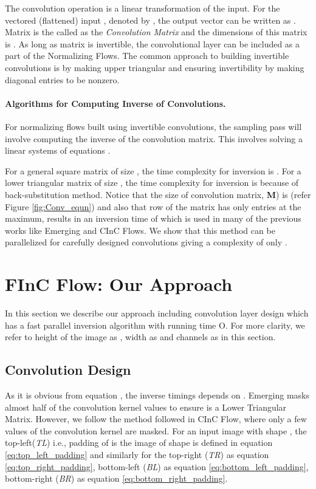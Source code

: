 \documentclass[a4paper,twoside]{article}
\theoremstyle{definition}
\begin{document}
The convolution operation is a linear transformation of the input. For the vectored (flattened) input , denoted by , the output vector  can be written as  . Matrix  is the called as the \emph{Convolution Matrix} and the dimensions of this matrix is . As long as matrix  is invertible, the convolutional layer can be included as a part of the Normalizing Flows. The common approach to building invertible convolutions is by making  upper triangular and ensuring invertibility by making diagonal entries to be nonzero.



\paragraph{Algorithms for Computing Inverse of Convolutions.}
For normalizing flows built using invertible convolutions, the sampling pass will involve computing the inverse of the convolution matrix. This involves solving a linear systems of equations .

For a general square matrix of size , the time complexity for inversion is . For a lower triangular matrix of size , the time complexity for inversion is  because of back-substitution method. Notice that the size of convolution matrix, \textbf{M}) is  (refer Figure \ref{fig:Conv_equn}) and also that row of the matrix has only  entries at the maximum, results in an inversion time of  which is used in many of the previous works like Emerging and CInC Flows. We show that this method can be parallelized for carefully designed convolutions giving a complexity of only .


\section{FInC Flow: Our Approach}
In this section we describe our approach including convolution layer design which has a fast parallel inversion algorithm with running time O. For more clarity, we refer to height of the image as , width as  and channels as  in this section.


\subsection{Convolution Design} \label{sec:conv-design}
As it is obvious from equation , the inverse timings depends on . Emerging \citep{behrmann2019invertible} masks almost half of the convolution kernel values to ensure  is a Lower Triangular Matrix. However, we follow the method followed in CInC Flow, where only a few values of the convolution kernel are masked.
For an input image  with shape , the top-left(\emph{TL}) i.e.,  padding of  is the image  of shape  is defined in equation \ref{eq:top_left_padding} and similarly for the top-right (\emph{TR}) as equation \ref{eq:top_right_padding}, bottom-left (\emph{BL}) as equation \ref{eq:bottom_left_padding}, bottom-right (\emph{BR}) as equation \ref{eq:bottom_right_padding}. 
\end{document}

